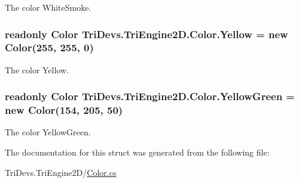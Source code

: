 The color White\-Smoke. 

\hypertarget{struct_tri_devs_1_1_tri_engine2_d_1_1_color_a12f1e207652838fa87bd1236c94b8da3}{
\subsubsection[{Yellow}]{\setlength{\rightskip}{0pt plus 5cm}readonly {\bf Color} Tri\-Devs.\-Tri\-Engine2\-D.\-Color.\-Yellow = new {\bf Color}(255, 255, 0)\hspace{0.3cm}{\ttfamily [static]}}}\label{struct_tri_devs_1_1_tri_engine2_d_1_1_color_a12f1e207652838fa87bd1236c94b8da3}


The color Yellow. 

\hypertarget{struct_tri_devs_1_1_tri_engine2_d_1_1_color_a3fc60968e772c7dd60304d35a7a87b83}{
\subsubsection[{Yellow\-Green}]{\setlength{\rightskip}{0pt plus 5cm}readonly {\bf Color} Tri\-Devs.\-Tri\-Engine2\-D.\-Color.\-Yellow\-Green = new {\bf Color}(154, 205, 50)\hspace{0.3cm}{\ttfamily [static]}}}\label{struct_tri_devs_1_1_tri_engine2_d_1_1_color_a3fc60968e772c7dd60304d35a7a87b83}


The color Yellow\-Green. 



The documentation for this struct was generated from the following file\-:\begin{DoxyCompactItemize}
\item 
Tri\-Devs.\-Tri\-Engine2\-D/\hyperlink{_color_8cs}{Color.\-cs}\end{DoxyCompactItemize}
